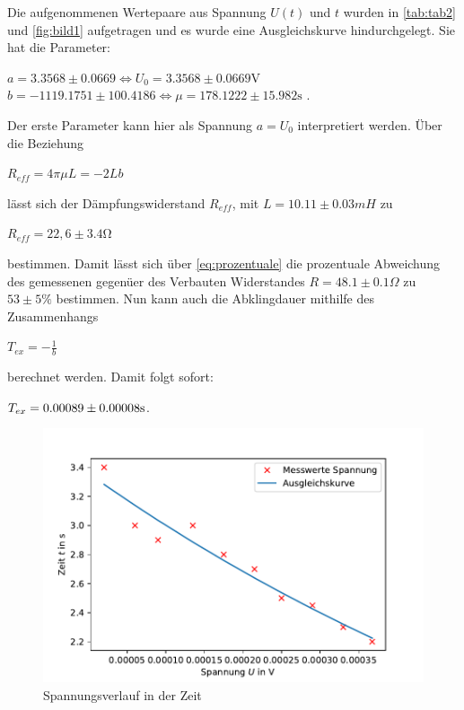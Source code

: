 \documentclass[
  bibliography=totoc,     %
  captions=tableheading,  %
  titlepage=firstiscover, %
]{scrartcl}
\begin{document}
  \label{sec:abklingdauer}
  Die aufgenommenen Wertepaare aus Spannung $U(t)$ und $t$ wurden in \autoref{tab:tab2} und \autoref{fig:bild1}
  aufgetragen und es wurde eine Ausgleichskurve hindurchgelegt. Sie hat die Parameter:
  \begin{center}
      
          $a = 3.3568 \pm 0.0669 \Leftrightarrow U_0 = 3.3568 \pm 0.0669 \si{\volt}$ \\
          $b = -1119.1751 \pm 100.4186 \Leftrightarrow \mu = 178.1222 \pm 15.982 \si{\second}$ .\\
      
  \end{center}  
  Der erste Parameter kann hier als Spannung $a=U_0$ interpretiert werden.
  Über die Beziehung 
  \begin{center}
      $R_{eff} = 4\pi\mu L = -2 L b$
  \end{center}


  lässt sich der Dämpfungswiderstand $R_{eff}$, mit $L = 10.11 \pm 0.03 \si{mH}$ zu
  \begin{center}
      $R_{eff} = 22,6 \pm 3.4 \si{\ohm}$
  \end{center}
  bestimmen. Damit lässt sich über \autoref{eq:prozentuale} die prozentuale Abweichung des gemessenen
  gegenüer des Verbauten Widerstandes $R = 48.1 \pm 0.1  {\Omega}$ zu $53\pm 5 \si{\percent}$ bestimmen.
  Nun kann auch die Abklingdauer mithilfe des Zusammenhangs
  \begin{center}
      $T_{ex} = - \frac{1}{b}$
  \end{center}
  berechnet werden. Damit folgt sofort:
  \begin{center}
      $T_{ex} = 0.00089\pm 0.00008 \si[]{s}$. \\
  \end{center}

  \begin{figure}[h]
      \centering
      \includegraphics{spannungsverlauf.pdf}
      \caption{Spannungsverlauf in der Zeit}
      \label{fig:bild1}
  \end{figure}
\end{document}
